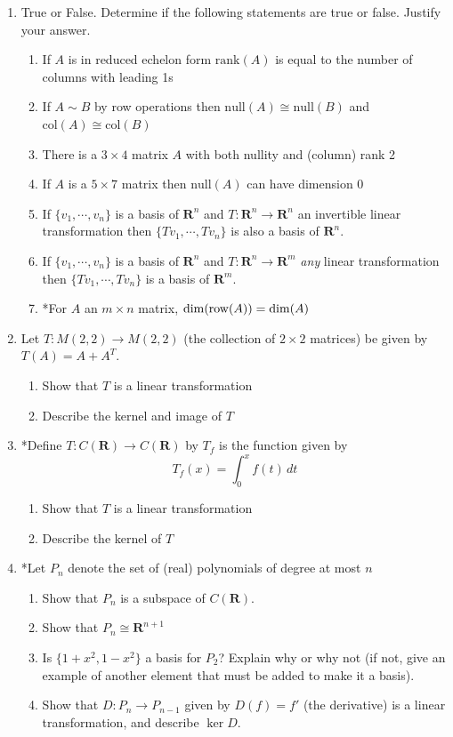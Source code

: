 \documentclass[12pt]{article}
\numberwithin{equation}{subsection}
\numberwithin{figure}{subsection}
\theoremstyle{note}
\newcommand\nul[1]{\mathrm{null}(#1)}
\newcommand\col[1]{\mathrm{col}(#1)}
\newcommand\row[1]{\mathrm{row}(#1)}
\newcommand\rank[1]{\mathrm{rank}(#1)}
\begin{document}
\begin{enumerate}[label=\arabic*.]
	

	
	\item True or False. Determine if the following statements are true or false. Justify your answer.
	\begin{enumerate}
		\item If $A$ is in reduced echelon form $\rank{A}$ is equal to the number of columns with leading 1s
		\item If $A\sim B$ by row operations then $\nul{A}\cong \nul{B}$ and $\col{A}\cong \col{B}$
		\item There is a $3\times 4$ matrix $A$ with both nullity and (column) rank 2
		\item If $A$ is a $5\times 7$ matrix then $\nul{A}$ can have dimension $0$	
		\item If $\{v_1,\cdots,v_n\}$ is a basis of $\mathbf{R}^n$ and $T\colon \mathbf{R}^n\to\mathbf{R}^n$ an invertible linear transformation then $\{Tv_1,\cdots,Tv_n\}$ is also a basis of $\mathbf{R}^n$. 
		\item If $\{v_1,\cdots,v_n\}$ is a basis of $\mathbf{R}^n$ and $T\colon \mathbf{R}^n\to\mathbf{R}^m$ \textit{any} linear transformation then $\{Tv_1,\cdots,Tv_n\}$ is a basis of $\mathbf{R}^m$. 
		\item *For $A$ an $m\times n$ matrix, $\dim(\row A)=\dim(\null A)$
	\end{enumerate}
	
	
	\item Let $T\colon M(2,2)\to M(2,2)$ (the collection of $2\times 2$ matrices) be given by $T(A)=A+A^T$. 
	\begin{enumerate}
		\item Show that $T$ is a linear transformation
		\item Describe the kernel and image of $T$
	\end{enumerate}
	
		\item *Define $T\colon C(\mathbf{R})\to C(\mathbf{R})$ by $T_f$ is the function given by \[ T_f(x)=\int_0^x f(t)\,dt\]
	\begin{enumerate}
		\item Show that $T$ is a linear transformation
		\item Describe the kernel of $T$
	\end{enumerate}
	

	\item *Let $P_n$ denote the set of (real) polynomials of degree at most $n$
	\begin{enumerate}
		\item Show that $P_n$ is a subspace of $C(\mathbf{R})$. 
		\item Show that $P_n\cong \mathbf{R}^{n+1}$
		\item Is $\{1+x^2, 1-x^2\}$ a basis for $P_2$? Explain why or why not (if not, give an example of another element that must be added to make it a basis).  
		\item Show that $D\colon P_n\to P_{n-1}$ given by $D(f)=f'$ (the derivative) is a linear transformation, and describe $\ker D$.
	\end{enumerate} 
	
\end{enumerate}
\end{document}
